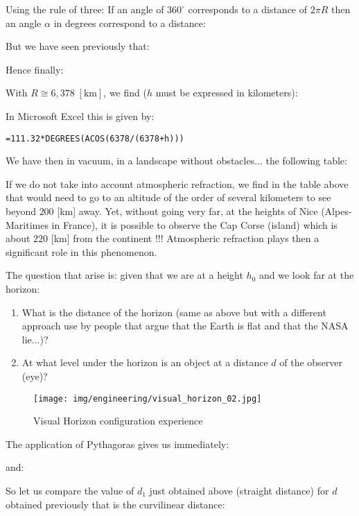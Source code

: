 	Using the rule of three:
	If an angle of $360^{\circ}$ corresponds to a distance of $2\pi R$ then an angle $\alpha$ in degrees correspond to a distance:
	
	But we have seen previously that:
	
	Hence finally:
	
	With $R\cong 6,378\;[\text{km}]$, we find ($h$ must be expressed in kilometers):
	
	In Microsoft Excel this is given by:
	\begin{center}
	\texttt{=111.32*DEGREES(ACOS(6378/(6378+h)))}
	\end{center}
	We have then in vacuum, in a landscape without obstacles... the following table:
		
	\begin{tcolorbox}[title=Remark,colframe=black,arc=10pt]
	If we do not take into account atmospheric refraction, we find in the table above that would need to go to an altitude of the order of several kilometers to see beyond $200$ [km] away. Yet, without going very far, at the heights of Nice (Alpes-Maritimes in France), it is possible to observe the Cap Corse (island) which is about $220$ [km] from the continent !!! Atmospheric refraction plays then a significant role in this phenomenon.
	\end{tcolorbox}
	The question that arise is: given that we are at a height $h_0$ and we look far at the horizon:
	\begin{enumerate}
		\item What is the distance of the horizon (same as above but with a different approach use by people that argue that the Earth is flat and that the NASA lie...)?

		\item At what level under the horizon is an object at a distance $d$ of the observer (eye)?
	\end{enumerate}
	\begin{figure}[H]
		\begin{center}
			\texttt{[image: img/engineering/visual\_horizon\_02.jpg]}
			\caption{Visual Horizon configuration experience}
		\end{center}	
	\end{figure}
	The application of Pythagoras gives us immediately:
	
	and:
	
	So let us compare the value of $d_1$ just obtained above (straight distance) for $d$ obtained previously that is the curvilinear distance:
	
